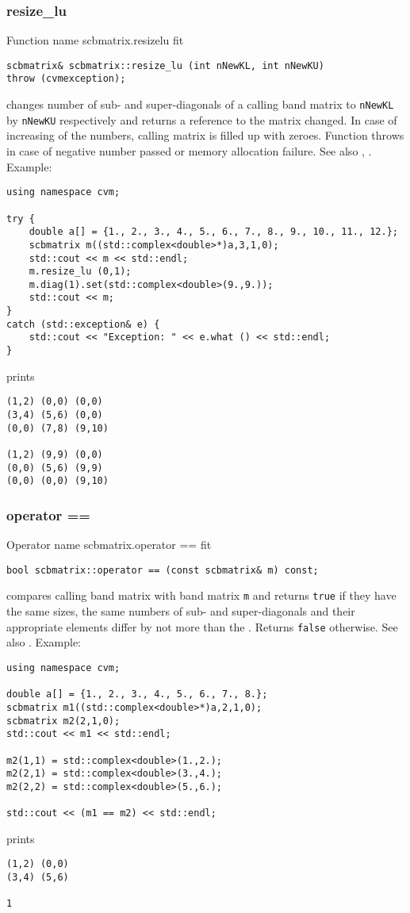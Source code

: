 \subsubsection{resize\_lu}
Function%
\pdfdest name {scbmatrix.resizelu} fit
\begin{verbatim}
scbmatrix& scbmatrix::resize_lu (int nNewKL, int nNewKU) 
throw (cvmexception);
\end{verbatim}
changes  number of sub- and super-diagonals 
of a calling band matrix to \verb"nNewKL" by \verb"nNewKU" respectively
and returns a reference to
the matrix changed. In case of increasing of the numbers, calling matrix
is filled up with zeroes. 
Function throws  
in case of negative number passed or memory allocation failure.
See also ,
.
Example:
\begin{Verbatim}
using namespace cvm;

try {
    double a[] = {1., 2., 3., 4., 5., 6., 7., 8., 9., 10., 11., 12.};
    scbmatrix m((std::complex<double>*)a,3,1,0);
    std::cout << m << std::endl;
    m.resize_lu (0,1);
    m.diag(1).set(std::complex<double>(9.,9.));
    std::cout << m;
}
catch (std::exception& e) {
    std::cout << "Exception: " << e.what () << std::endl;
}
\end{Verbatim}
prints
\begin{Verbatim}
(1,2) (0,0) (0,0)
(3,4) (5,6) (0,0)
(0,0) (7,8) (9,10)

(1,2) (9,9) (0,0)
(0,0) (5,6) (9,9)
(0,0) (0,0) (9,10)
\end{Verbatim}
\newpage





\subsubsection{operator ==}
Operator%
\pdfdest name {scbmatrix.operator ==} fit
\begin{verbatim}
bool scbmatrix::operator == (const scbmatrix& m) const;
\end{verbatim}
compares  calling band matrix with  band matrix \verb"m"
and returns \verb"true" if they have the same sizes, the same
numbers of sub- and super-diagonals 
and their appropriate elements differ by not more than the
.
Returns \verb"false" otherwise.
See also .
Example:
\begin{Verbatim}
using namespace cvm;

double a[] = {1., 2., 3., 4., 5., 6., 7., 8.};
scbmatrix m1((std::complex<double>*)a,2,1,0);
scbmatrix m2(2,1,0);
std::cout << m1 << std::endl;

m2(1,1) = std::complex<double>(1.,2.); 
m2(2,1) = std::complex<double>(3.,4.); 
m2(2,2) = std::complex<double>(5.,6.);

std::cout << (m1 == m2) << std::endl;
\end{Verbatim}
prints
\begin{Verbatim}
(1,2) (0,0)
(3,4) (5,6)

1
\end{Verbatim}
\newpage




